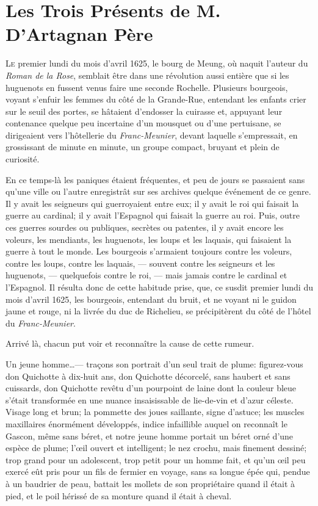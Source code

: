 
\chapter{Les Trois Présents de M. D'Artagnan Père}

\lettrine{L}{e} premier lundi du mois d'avril 1625, le bourg de Meung, où naquit l'auteur du \textit{Roman de la Rose}, semblait être dans une révolution aussi entière que si les huguenots en fussent venus faire une seconde Rochelle. Plusieurs bourgeois, voyant s'enfuir les femmes du côté de la Grande-Rue, entendant les enfants crier sur le seuil des portes, se hâtaient d'endosser la cuirasse et, appuyant leur contenance quelque peu incertaine d'un mousquet ou d'une pertuisane, se dirigeaient vers l'hôtellerie du \textit{Franc-Meunier}, devant laquelle s'empressait, en grossissant de minute en minute, un groupe compact, bruyant et plein de curiosité. 

En ce temps-là les paniques étaient fréquentes, et peu de jours se passaient sans qu'une ville ou l'autre enregistrât sur ses archives quelque événement de ce genre. Il y avait les seigneurs qui guerroyaient entre eux; il y avait le roi qui faisait la guerre au cardinal; il y avait l'Espagnol qui faisait la guerre au roi. Puis, outre ces guerres sourdes ou publiques, secrètes ou patentes, il y avait encore les voleurs, les mendiants, les huguenots, les loups et les laquais, qui faisaient la guerre à tout le monde. Les bourgeois s'armaient toujours contre les voleurs, contre les loups, contre les laquais, --- souvent contre les seigneurs et les huguenots, --- quelquefois contre le roi, --- mais jamais contre le cardinal et l'Espagnol. Il résulta donc de cette habitude prise, que, ce susdit premier lundi du mois d'avril 1625, les bourgeois, entendant du bruit, et ne voyant ni le guidon jaune et rouge, ni la livrée du duc de Richelieu, se précipitèrent du côté de l'hôtel du \textit{Franc-Meunier}. 

Arrivé là, chacun put voir et reconnaître la cause de cette rumeur. 

Un jeune homme\dots --- traçons son portrait d'un seul trait de plume: figurez-vous don Quichotte à dix-huit ans, don Quichotte décorcelé, sans haubert et sans cuissards, don Quichotte revêtu d'un pourpoint de laine dont la couleur bleue s'était transformée en une nuance insaisissable de lie-de-vin et d'azur céleste. Visage long et brun; la pommette des joues saillante, signe d'astuce; les muscles maxillaires énormément développés, indice infaillible auquel on reconnaît le Gascon, même sans béret, et notre jeune homme portait un béret orné d'une espèce de plume; l'œil ouvert et intelligent; le nez crochu, mais finement dessiné; trop grand pour un adolescent, trop petit pour un homme fait, et qu'un œil peu exercé eût pris pour un fils de fermier en voyage, sans sa longue épée qui, pendue à un baudrier de peau, battait les mollets de son propriétaire quand il était à pied, et le poil hérissé de sa monture quand il était à cheval. 

